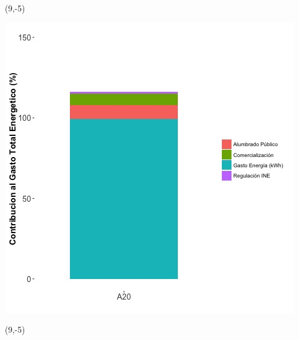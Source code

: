 \documentclass{article}\usepackage[]{graphicx}\usepackage[]{color}
\newenvironment{knitrout}{}{} %
\begin{document}
 \begin{textblock}{1}(9,-5)
\begin{minipage}{20em}
\begingroup

\endgroup
\end{minipage}
\end{textblock}

\begin{knitrout}
\color{fgcolor}
\includegraphics[scale=0.65]{figure/A20_costvars_plot.jpg} 
\end{knitrout}

 \begin{textblock}{1}(9,-5)
\begin{minipage}{20em}
\begingroup

\endgroup
\end{minipage}
\end{textblock}
\end{document}
